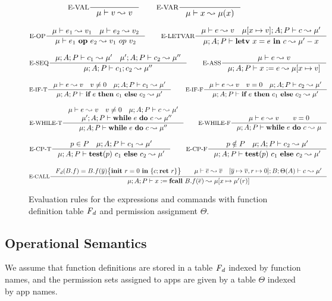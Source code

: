 \begin{figure*}[ht]
{\tiny
\[
\inference[E-VAL]{}{\mu \vdash \leVAL{v}  \leadsto v}
\qquad
\inference[E-VAR]{}{\mu \vdash \leVAR{x}  \leadsto \mu(x)}
\]

\[
\inference[E-OP]{\mu \vdash e_1 \leadsto v_1\quad \mu \vdash e_2 \leadsto v_2}
{\mu \vdash \leOP{e_1}{e_2} \leadsto v_1~op~v_2}
\qquad
\inference[E-LETVAR]{\mu \vdash e \leadsto v \quad \mu [ x \mapsto v ]; A ; P \vdash c \leadsto \mu'}
{\mu; A; P \vdash \lcLETVAR{x}{e}{c} \leadsto \mu' - x}
\]

\[
\inference[E-SEQ]{\mu;A; P \vdash c_1 \leadsto \mu' \quad \mu';A; P \vdash c_2 \leadsto \mu''}
{\mu;A;P \vdash \lcSEQ{c_1}{c_2} \leadsto \mu''}
\qquad
\inference[E-ASS]{\mu \vdash e \leadsto v}
{\mu; A; P \vdash \lcASS{x}{e} \leadsto \mu [ x \mapsto v ]}
\]

\[
\inference[E-IF-T]{\mu \vdash e \leadsto v\quad v\neq 0\quad \mu; A; P \vdash c_1 \leadsto \mu'}
{\mu; A; P \vdash \lcIF{e}{c_1}{c_2} \leadsto \mu'}
\qquad
\inference[E-IF-F]{\mu \vdash e \leadsto v\quad v = 0\quad \mu;A; P \vdash c_2 \leadsto \mu'}
{\mu;A; P \vdash \lcIF{e}{c_1}{c_2} \leadsto \mu'}
\]

\[
\inference[E-WHILE-T]{
\mu \vdash e \leadsto v\quad v\neq 0\quad
\mu;A; P \vdash c \leadsto \mu'\\
\quad \mu' ; A ; P \vdash \lcWHILE{e}{c} \leadsto \mu''
}
{\mu;A; P \vdash \lcWHILE{e}{c} \leadsto \mu''}
\qquad
\inference[E-WHILE-F]{\mu \vdash e \leadsto v\qquad v = 0}
{\mu;A; P \vdash \lcWHILE{e}{c} \leadsto \mu}
\]

\[
\inference[E-CP-T]{p\in P \quad \mu; A; P \vdash c_1 \leadsto \mu'}
{\mu; A ; P \vdash \lcCP{p}{c_1}{c_2} \leadsto \mu'}
\qquad
\inference[E-CP-F]{p\notin P \quad \mu;A;P \vdash c_2 \leadsto \mu'}
{\mu;A;P \vdash \lcCP{p}{c_1}{c_2} \leadsto \mu'}
\]

\[
\inference[E-CALL]{
\FD(B.f) = \lpPROG{B.f}{\overline{y}}{c}{\lpRES} \qquad
\mu\vdash\overline{e} \leadsto \overline{v} \quad
[\overline{y} \mapsto \overline{v}, r \mapsto 0] ; B; \Theta(A) \vdash c \leadsto \mu'}
{\mu;A;P \vdash \lcCALL{x}{B.f}{\overline{e}} \leadsto \mu[x \mapsto \mu'(r) ]}
\]
}
\caption{Evaluation rules for the expressions and commands with function definition table $\mathit{F_d}$ and permission assignment $\Theta.$
}
\label{fig:semantics}
\end{figure*}
 
\subsection{Operational Semantics}\label{sec:semantics}
We assume that function definitions are stored in a table $\mathit{F_d}$ indexed by function names, and the permission sets assigned to apps are given by a table $\Theta$ indexed by app names.

